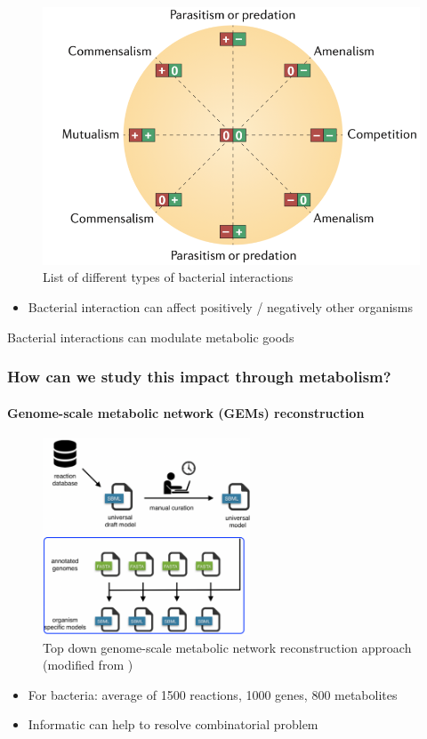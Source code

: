 \documentclass[8pt]{beamer}
\begin{document}
\begin{frame}
{\begin{minipage}{0.5\textwidth}
\begin{figure}
	\includegraphics[width=\textwidth]{figures/interaction.png}
    \caption{List of different types of bacterial interactions \tiny \citep{Faust2012} }
\end{figure}
\begin{itemize}
\item Bacterial interaction can affect positively / negatively other organisms
\end{itemize}
\end{minipage}
\begin{block}{}

Bacterial interactions can modulate metabolic goods

\end{block}}
\end{frame}

\begin{frame}
\frametitle{How can we study this impact through metabolism? }
\framesubtitle{Genome-scale metabolic network (GEMs) reconstruction}
\begin{figure}
\centering
\includegraphics[width=0.55\textwidth]{figures/top-down}
\caption{Top down genome-scale metabolic network reconstruction approach \tiny (modified from \cite{Machado2018})}
\end{figure}
\begin{itemize}
\item For bacteria: average of 1500 reactions, 1000 genes, 800 metabolites
\item Informatic can help to resolve combinatorial problem
\end{itemize}
\end{frame}
\end{document}
